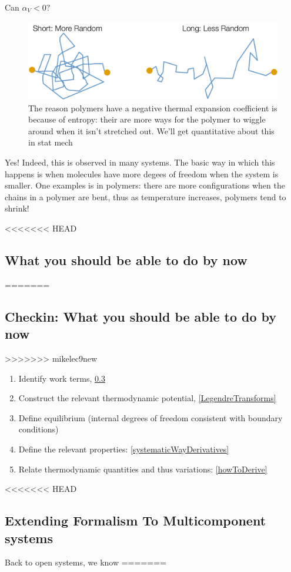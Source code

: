 \documentclass[12pt]{article}
\begin{document}
Can $\alpha_V < 0?$  
\begin{figure}[h]
\centering
\includegraphics[width=\textwidth]{Short_and_Long_Comparison}
\caption{The reason polymers have a negative thermal expansion coefficient is because of entropy: their are more ways for the polymer to wiggle around when it isn't stretched out. We'll get quantitative about this in stat mech}
\label{shortLongEntropy}
\end{figure}
Yes! Indeed, this is observed in many systems. The basic way in which this happens is when molecules have more degees of freedom when the system is smaller. One examples is in polymers: there are more configurations when the chains in a polymer are bent, thus as temperature increases, polymers tend to shrink!

<<<<<<< HEAD
\subsection{What you should be able to do by now}
=======
\subsection{Checkin: What you should be able to do by now}
>>>>>>> mikelec9new
\begin{enumerate}[(1)]
\item Identify work terms, \ref{}
\item Construct the relevant thermodynamic potential, \ref{LegendreTransforms}
\item Define equilibrium (internal degrees of freedom consistent with boundary conditions) 
\item Define the relevant properties: \ref{systematicWayDerivatives}
\item Relate thermodynamic quantities and thus variations: \ref{howToDerive}
\end{enumerate}

<<<<<<< HEAD
\subsection{Extending Formalism To Multicomponent systems}
Back to open systems, we know
=======
\end{document}
